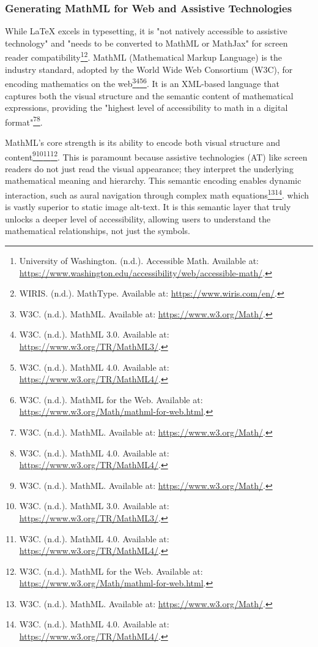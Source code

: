\subsubsection{Generating MathML for Web and Assistive Technologies}
While LaTeX excels in typesetting, it is "not natively accessible to assistive technology" and "needs to be converted to MathML or MathJax" for screen reader compatibility\footnote{University of Washington. (n.d.). Accessible Math. Available at: \url{https://www.washington.edu/accessibility/web/accessible-math/}.}\footnote{WIRIS. (n.d.). MathType. Available at: \url{https://www.wiris.com/en/}.}. MathML (Mathematical Markup Language) is the industry standard, adopted by the World Wide Web Consortium (W3C), for encoding mathematics on the web\footnote{W3C. (n.d.). MathML. Available at: \url{https://www.w3.org/Math/}.}\footnote{W3C. (n.d.). MathML 3.0. Available at: \url{https://www.w3.org/TR/MathML3/}.}\footnote{W3C. (n.d.). MathML 4.0. Available at: \url{https://www.w3.org/TR/MathML4/}.}\footnote{W3C. (n.d.). MathML for the Web. Available at: \url{https://www.w3.org/Math/mathml-for-web.html}.}. It is an XML-based language that captures both the visual structure and the semantic content of mathematical expressions, providing the "highest level of accessibility to math in a digital format"\footnote{W3C. (n.d.). MathML. Available at: \url{https://www.w3.org/Math/}.}\footnote{W3C. (n.d.). MathML 4.0. Available at: \url{https://www.w3.org/TR/MathML4/}.}.

MathML's core strength is its ability to encode both visual structure and content\footnote{W3C. (n.d.). MathML. Available at: \url{https://www.w3.org/Math/}.}\footnote{W3C. (n.d.). MathML 3.0. Available at: \url{https://www.w3.org/TR/MathML3/}.}\footnote{W3C. (n.d.). MathML 4.0. Available at: \url{https://www.w3.org/TR/MathML4/}.}\footnote{W3C. (n.d.). MathML for the Web. Available at: \url{https://www.w3.org/Math/mathml-for-web.html}.}. This is paramount because assistive technologies (AT) like screen readers do not just read the visual appearance; they interpret the underlying mathematical meaning and hierarchy. This semantic encoding enables dynamic interaction, such as aural navigation through complex math equations\footnote{W3C. (n.d.). MathML. Available at: \url{https://www.w3.org/Math/}.}\footnote{W3C. (n.d.). MathML 4.0. Available at: \url{https://www.w3.org/TR/MathML4/}.}. which is vastly superior to static image alt-text. It is this semantic layer that truly unlocks a deeper level of accessibility, allowing users to understand the mathematical relationships, not just the symbols.

